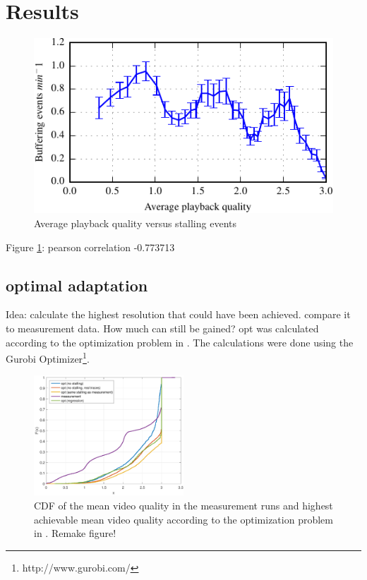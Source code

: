 
\section{Results}
\label{sec:results}

\begin{figure}[t]
\centering
\includegraphics[width=0.95\linewidth]{figs/33qualityvstalling}%
\caption{Average playback quality versus stalling events}
\label{fig:qualityvsstalling}%
\end{figure}

Figure \ref{fig:qualityvsstalling}: pearson correlation -0.773713

\subsection{optimal adaptation}

Idea: calculate the highest resolution that could have been achieved. compare it to measurement data. How much can still be gained?
opt was calculated according to the optimization problem in \cite{hossfeld2015identifying}. The calculations were done using the Gurobi Optimizer\footnote{http://www.gurobi.com/}.

\begin{figure}[t]
\centering
\includegraphics[width=0.5\textwidth]{figs/quality}%
\caption{CDF of the mean video quality in the measurement runs and highest achievable mean video quality according to the optimization problem in \cite{hossfeld2015identifying}. Remake figure!}
\label{fig:opt}%
\end{figure}

